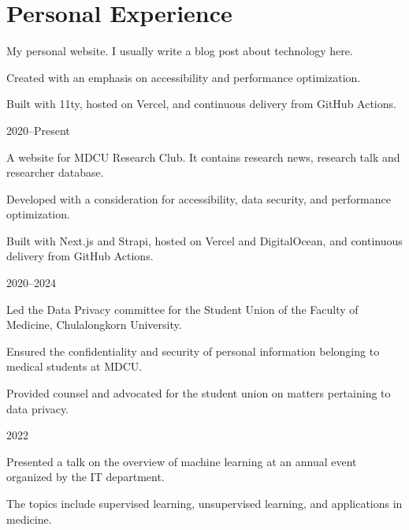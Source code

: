 \documentclass{cv}
\begin{document}
\section{Personal Experience}
\begin{cv_table}
  {\begin{cv_itemize}
      \item My personal website. I usually write a blog post about technology here.
      \item Created with an emphasis on accessibility and performance optimization.
      \item Built with 11ty, hosted on Vercel, and continuous delivery from GitHub Actions.
    \end{cv_itemize}
  }{}{2020--Present}
  {\begin{cv_itemize}
      \item A website for MDCU Research Club. It contains research news, research talk and researcher database.
      \item Developed with a consideration for accessibility, data security, and performance optimization.
      \item Built with Next.js and Strapi, hosted on Vercel and DigitalOcean, and continuous delivery from GitHub Actions.
    \end{cv_itemize}
  }{}{2020--2024}
  {\begin{cv_itemize}
      \item Led the Data Privacy committee for the Student Union of the Faculty of Medicine, Chulalongkorn University.
      \item Ensured the confidentiality and security of personal information belonging to medical students at MDCU.
      \item Provided counsel and advocated for the student union on matters pertaining to data privacy.
    \end{cv_itemize}
  }{}{2022}
  {\begin{cv_itemize}
      \item Presented a talk on the overview of machine learning at an annual event organized by the IT department.
      \item The topics include supervised learning, unsupervised learning, and applications in medicine.
    \end{cv_itemize}
}
\end{cv_table}
\end{document}

